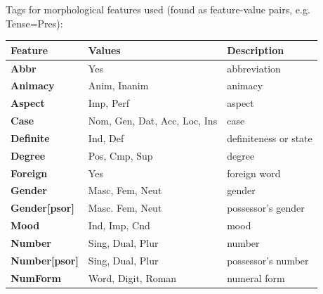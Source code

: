 \documentclass[a4paper,oneside,12pt]{article}
\begin{document}
\begin{samepage}
  Tags for morphological features used (found as feature-value pairs, e.g.
  Tense=Pres):
  \begin{center}
    \begin{tabular}{|l|l|l|}
      \hline
      \textbf{Feature}          & \textbf{Values}                   &
      \textbf{Description}
      \\ \hline
      \textbf{Abbr}             & Yes                               &
      abbreviation                                                               \\
      \hline
      \textbf{Animacy}          & Anim, Inanim                      & animacy
      \\ \hline
      \textbf{Aspect}           & Imp, Perf                         & aspect
      \\ \hline
      \textbf{Case}             & Nom, Gen, Dat, Acc, Loc, Ins      & case
      \\ \hline
      \textbf{Definite}         & Ind, Def                          &
      definiteness or state                                                      \\ \hline
      \textbf{Degree}           & Pos, Cmp, Sup                     & degree
      \\ \hline
      \textbf{Foreign}          & Yes                               & foreign
      word                                                                       \\
      \hline
      \textbf{Gender}           & Masc, Fem, Neut                   & gender
      \\ \hline
      \textbf{Gender{[}psor{]}} & Masc. Fem, Neut                   &
      possessor's gender                                                         \\ \hline
      \textbf{Mood}             & Ind, Imp, Cnd                     & mood
      \\ \hline
      \textbf{Number}           & Sing, Dual, Plur                  & number
      \\ \hline
      \textbf{Number{[}psor{]}} & Sing, Dual, Plur                  &
      possessor's number                                                         \\ \hline
      \textbf{NumForm}          & Word, Digit, Roman                & numeral
      form                                                                       \\
      \hline

\end{tabular}
\end{center}
\end{samepage}
\end{document}
